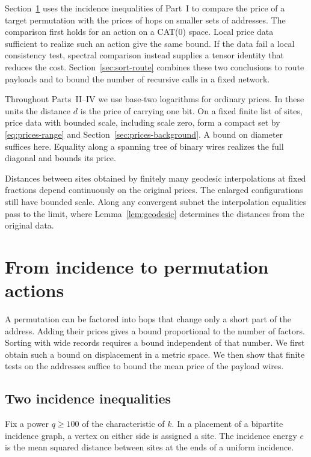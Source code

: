 Section~\ref{sec:sort-action} uses the incidence inequalities of Part~I
to compare the price of a target permutation with the prices of hops on
smaller sets of addresses. The comparison first holds for an action on
a CAT(0) space. Local price data sufficient to realize such an action
give the same bound. If the data fail a local consistency test, spectral
comparison instead supplies a tensor identity that reduces the cost.
Section~\ref{sec:sort-route} combines these two conclusions to route
payloads and to bound the number of recursive calls in a fixed network.

Throughout Parts~II--IV we use base-two logarithms for ordinary prices.
In these units the distance $d$ is the price of carrying one bit.
On a fixed finite list of sites, price data with bounded scale,
including scale zero, form a compact set by \eqref{eq:prices-range}
and Section~\ref{sec:prices-background}. A bound on diameter suffices
here. Equality along a spanning tree of binary wires realizes the
full diagonal and bounds its price.

Distances between sites obtained by finitely many geodesic interpolations
at fixed fractions depend continuously on the original prices. The
enlarged configurations still have bounded scale. Along any convergent
subnet the interpolation equalities pass to the limit, where
Lemma~\ref{lem:geodesic} determines the distances from the original data.


\section{From incidence to permutation actions}\label{sec:sort-action}

A permutation can be factored into hops that change only a short
part of the address. Adding their prices gives a bound proportional
to the number of factors. Sorting with wide records requires a
bound independent of that number. We first obtain such a bound on
displacement in a metric space. We then show that finite tests on
the addresses suffice to bound the mean price of the payload wires.

\subsection{Two incidence inequalities}

Fix a power $q\ge100$ of the characteristic of $k$. In a placement
of a bipartite incidence graph, a vertex on either side is assigned
a site. The incidence energy $e$ is the mean squared distance between
sites at the ends of a uniform incidence.

